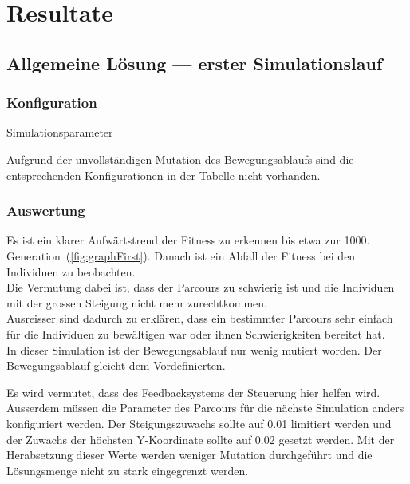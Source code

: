 %
%


\chapter{Resultate\label{chap:Resultate}}

  \section{Allgemeine Lösung --- erster Simulationslauf}

    \subsection{Konfiguration\label{sub:confSecond}}

      \begin{table}[H]
        \centering
        
        \caption{Simulationsparameter}
      \end{table}

      Aufgrund der unvollständigen Mutation des Bewegungsablaufs sind die entsprechenden
      Konfigurationen in der Tabelle nicht vorhanden.

    \subsection{Auswertung}

      Es ist ein klarer Aufwärtstrend der Fitness zu erkennen bis etwa zur 1000. Generation~(\vref{fig:graphFirst}).
      Danach ist ein Abfall der Fitness bei den Individuen zu beobachten.
      \\
      Die Vermutung dabei ist,
      dass der Parcours zu schwierig ist und die Individuen mit der grossen Steigung nicht mehr zurechtkommen.
      \\
      Ausreisser sind dadurch zu erklären,
      dass ein bestimmter Parcours sehr einfach für die Individuen zu bewältigen war oder ihnen Schwierigkeiten bereitet hat.
      \\
      In dieser Simulation ist der Bewegungsablauf nur wenig mutiert worden.
      Der Bewegungsablauf gleicht dem Vordefinierten.

      \medskip

      Es wird vermutet, dass des Feedbacksystems der Steuerung hier helfen wird.
      Ausserdem müssen die Parameter des Parcours für die nächste Simulation anders konfiguriert werden.
      Der Steigungszuwachs sollte auf 0.01 limitiert werden und der Zuwachs der höchsten Y-Koordinate
      sollte auf 0.02 gesetzt werden.
      Mit der Herabsetzung dieser Werte werden weniger Mutation durchgeführt und
      die Lösungsmenge nicht zu stark eingegrenzt werden.

